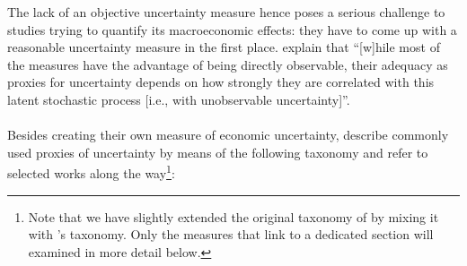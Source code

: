 \documentclass[a4paper,11pt,listof=nochaptergap,oneside,pointednumbers,bibtotoc,bigheadings,liststotoc]{scrbook}
\theoremstyle{mysatz}
\theoremstyle{mydefinition}
\theoremstyle{mytheorem}
\theoremstyle{mybemerkung}
\begin{document}
The lack of an objective uncertainty measure hence poses a serious challenge to studies trying to quantify its macroeconomic effects: they have to come up with a reasonable uncertainty measure in the first place. \citet[p. 1178]{juradoetal:15} explain that ``[w]hile most of the measures have the advantage of being directly observable, their adequacy as proxies for uncertainty depends on how strongly they are correlated with this latent stochastic process [i.e., with unobservable uncertainty]''.\\
\\ 
Besides creating their own measure of economic uncertainty, \citet{orlikandveldkamp:14} describe commonly used proxies of uncertainty by means of the following taxonomy and refer to selected works along the way\footnote{Note that we have slightly extended the original taxonomy of \citet{orlikandveldkamp:14} by mixing it with \citet{bontempietal:16}'s taxonomy. Only the measures that link to a dedicated section will examined in more detail below.}:
\end{document}
